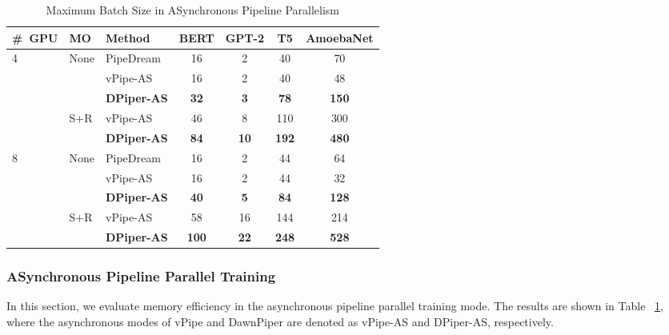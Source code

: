 \begin{table}[htbp]
  \centering
  \caption{Maximum Batch Size in ASynchronous Pipeline Parallelism}
    \begin{tabular}{m{2em}|m{2em}|m{5em}cccc}
    \toprule
    \#\ GPU & MO & Method & BERT & GPT-2 & T5 & AmoebaNet \\
    \midrule
    \multirow{5}{*}{4} & \multirow{3}{*}{None} & PipeDream & 16    & 2     & 40    & 70 \\
          &       & vPipe-AS & 16    & 2     & 40    & 48 \\
          &       & \textbf{DPiper-AS} & \textbf{32} & \textbf{3} & \textbf{78} & \textbf{150} \\
\cmidrule{2-7}          & \multirow{2}{*}{S+R} & vPipe-AS & 46    & 8     & 110   & 300 \\
          &       & \textbf{DPiper-AS} & \textbf{84} & \textbf{10} & \textbf{192} & \textbf{480} \\
    \midrule
    \multirow{5}{*}{8} & \multirow{3}{*}{None} & PipeDream & 16    & 2     & 44    & 64 \\
          &       & vPipe-AS & 16    & 2     & 44    & 32 \\
          &       & \textbf{DPiper-AS} & \textbf{40} & \textbf{5} & \textbf{84} & \textbf{128} \\
\cmidrule{2-7}          & \multirow{2}{*}{S+R} & vPipe-AS & 58    & 16    & 144   & 214 \\
          &       & \textbf{DPiper-AS} & \textbf{100} & \textbf{22} & \textbf{248} & \textbf{528} \\
    \bottomrule
    \end{tabular}%
  \label{table:maxbs-async}%
\end{table}

\subsubsection{ASynchronous Pipeline Parallel Training}
In this section, we evaluate memory efficiency in the asynchronous pipeline parallel training mode.
The results are shown in Table ~\ref{table:maxbs-async},
where the asynchronous modes of vPipe and DawnPiper are denoted as vPipe-AS and DPiper-AS, respectively.

